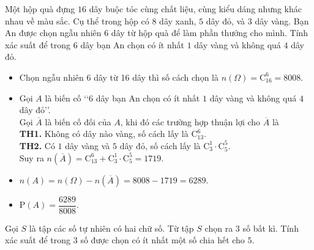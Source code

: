 \begin{vd}
	Một hộp quà đựng $16$ dây buộc tóc cùng chất liệu, cùng kiểu dáng nhưng khác nhau về màu sắc. Cụ thể trong hộp có $8$ dây xanh, $5$ dây đỏ, và $3$ dây vàng. Bạn An được chọn ngẫu nhiên 6 dây từ hộp quà để làm phần thưởng cho mình. Tính xác suất để trong $6$ dây bạn An chọn có ít nhất $1$ dây vàng và không quá $4$ dây đỏ.
	\loigiai
	{
		\begin{itemize}
			\item Chọn ngẫu nhiên 6 dây từ 16 dây thì số cách chọn là $n(\Omega)=\mathrm{C}_{16}^6=8008$.
			\item Gọi $A$ là biến cố \lq\lq $6$ dây bạn An chọn có ít nhất $1$ dây vàng và không quá $4$ dây đỏ\rq\rq.\\
			Gọi $\overline{A}$ là biến cố đối của $A$, khi đó các trường hợp thuận lợi cho $\overline{A}$ là\\
			\textbf{TH1.} Không có dây nào vàng, số cách lấy là $\mathrm{C}_{13}^6$.\\
			\textbf{TH2.} Có $1$ dây vàng và $5$ dây đỏ, số cách lấy là $\mathrm{C}_{3}^1 \cdot \mathrm{C}_{5}^5$.\\
			Suy ra $n(\overline{A})=\mathrm{C}_{13}^6 + \mathrm{C}_{3}^1 \cdot \mathrm{C}_{5}^5=1719$.
			\item $n(A)=n(\Omega)-n(\overline{A})=8008-1719=6289$.
			\item $\mathrm{P}(A)=\dfrac{6289}{8008}$.
		\end{itemize}
	}
\end{vd}
\begin{vd}
	Gọi $S$ là tập các số tự nhiên có hai chữ số. Từ tập $S$ chọn ra $3$ số bất kì. Tính xác suất để trong $3$ số được chọn có ít nhất một số chia hết cho $5$.
\end{vd}
